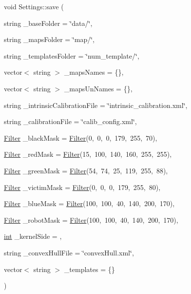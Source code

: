 {\footnotesize\ttfamily void Settings\+::save (\begin{DoxyParamCaption}\item[{string}]{\+\_\+base\+Folder = {\ttfamily \char`\"{}data/\char`\"{}},  }\item[{string}]{\+\_\+maps\+Folder = {\ttfamily \char`\"{}map/\char`\"{}},  }\item[{string}]{\+\_\+templates\+Folder = {\ttfamily \char`\"{}num\+\_\+template/\char`\"{}},  }\item[{vector$<$ string $>$}]{\+\_\+maps\+Names = {\ttfamily \{\}},  }\item[{vector$<$ string $>$}]{\+\_\+maps\+Un\+Names = {\ttfamily \{\}},  }\item[{string}]{\+\_\+intrinsic\+Calibration\+File = {\ttfamily \char`\"{}intrinsic\+\_\+calibration.xml\char`\"{}},  }\item[{string}]{\+\_\+calibration\+File = {\ttfamily \char`\"{}calib\+\_\+config.xml\char`\"{}},  }\item[{\mbox{\hyperlink{class_filter}{Filter}}}]{\+\_\+black\+Mask = {\ttfamily \mbox{\hyperlink{class_filter}{Filter}}(0,~0,~0,~179,~255,~70)},  }\item[{\mbox{\hyperlink{class_filter}{Filter}}}]{\+\_\+red\+Mask = {\ttfamily \mbox{\hyperlink{class_filter}{Filter}}(15,~100,~140,~160,~255,~255)},  }\item[{\mbox{\hyperlink{class_filter}{Filter}}}]{\+\_\+green\+Mask = {\ttfamily \mbox{\hyperlink{class_filter}{Filter}}(54,~74,~25,~119,~255,~88)},  }\item[{\mbox{\hyperlink{class_filter}{Filter}}}]{\+\_\+victim\+Mask = {\ttfamily \mbox{\hyperlink{class_filter}{Filter}}(0,~0,~0,~179,~255,~80)},  }\item[{\mbox{\hyperlink{class_filter}{Filter}}}]{\+\_\+blue\+Mask = {\ttfamily \mbox{\hyperlink{class_filter}{Filter}}(100,~100,~40,~140,~200,~170)},  }\item[{\mbox{\hyperlink{class_filter}{Filter}}}]{\+\_\+robot\+Mask = {\ttfamily \mbox{\hyperlink{class_filter}{Filter}}(100,~100,~40,~140,~200,~170)},  }\item[{\mbox{\hyperlink{draw_8hh_aa620a13339ac3a1177c86edc549fda9b}{int}}}]{\+\_\+kernel\+Side = {},  }\item[{string}]{\+\_\+convex\+Hull\+File = {\ttfamily \char`\"{}convexHull.xml\char`\"{}},  }\item[{vector$<$ string $>$}]{\+\_\+templates = {\ttfamily \{\}} }\end{DoxyParamCaption})}



